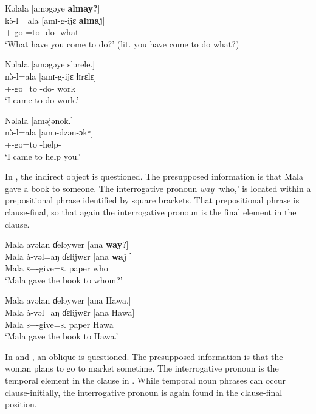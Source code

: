 \ea \label{ex:10:57}
Kəlala  [aməgəye  \textbf{almay?}]\\
\gll  k\`{ə}-l    =ala   [amɪ-g-ijɛ   \textbf{almaj}]\\
      {\twoS}+{\PFV}-go  =to  {\DEP}-do-{\CL}  what\\
\glt  ‘What have you come to do?’ (lit. you have come to do what?)
\z

\clearpage
\ea \label{ex:10:58}
Nəlala  [aməgəye  slərele.]\\
\gll  n\`{ə}-l=ala     [amɪ-g-ijɛ   ɬɪrɛlɛ]\\
      {\oneS}+{\PFV}-go=to  {\DEP}-do{}-{\CL}  work\\
\glt  ‘I came to do work.’ 
\z

\ea \label{ex:10:59}
Nəlala  [aməjənok.]\\
\gll  n\`{ə}-l=ala     [amə-dzən-ɔkʷ]\\
      {\oneS}+{\PFV}-go=to  {\DEP}-help-{\twoS}\\
\glt  ‘I came to help you.’ 
\z

In , the indirect object is questioned. The presupposed information is that Mala gave a book to someone. The interrogative pronoun \textit{way} ‘who,’ is located within a prepositional phrase identified by square brackets.  That prepositional phrase is clause-final, so that again the interrogative pronoun is the final element in the clause. 

\ea \label{ex:10:60}
Mala  avəlan  ɗeləywer  [ana  \textbf{way}?]\\
\gll  Mala   à-vəl=aŋ     ɗɛlijwɛr     [ana   \textbf{waj ]}\\
      Mala  \textsc{s}+{\PFV}-give=\textsc{s}.{\IO}  paper    {\DAT} who\\
\glt  ‘Mala gave the book to whom?’ 
\z

\ea \label{ex:10:61}
Mala  avəlan  ɗeləywer  [ana  Hawa.]\\
\gll  Mala   à-vəl=aŋ     ɗɛlijwɛr     [ana   Hawa]\\
      Mala  \textsc{s}+{\PFV}-give=\textsc{s}.{\IO}  paper    {\DAT} Hawa\\
\glt  ‘Mala gave the book to Hawa.’ 
\z

In  and , an oblique is questioned. The presupposed information is that the woman plans to go to market sometime. The interrogative pronoun is the temporal element in the clause in . While temporal noun phrases can occur clause-initially, the interrogative pronoun is again found in the clause-final position. 

